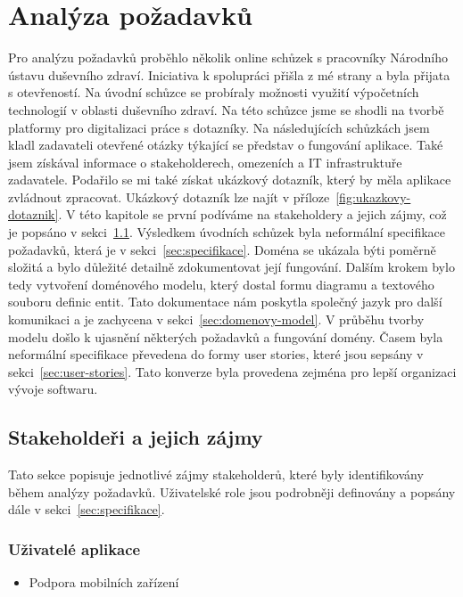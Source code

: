 \chapter{Analýza požadavků}\label{ch:analyza-pozadavku}

Pro analýzu požadavků proběhlo několik online schůzek s pracovníky Národního ústavu duševního zdraví.
Iniciativa k spolupráci přišla z mé strany a byla přijata s otevřeností.
Na úvodní schůzce se probíraly možnosti využití výpočetních technologií v oblasti duševního zdraví.
Na této schůzce jsme se shodli na tvorbě platformy pro digitalizaci práce s dotazníky.
Na následujících schůzkách jsem kladl zadavateli otevřené otázky týkající se představ o fungování aplikace.
Také jsem získával informace o stakeholderech, omezeních a IT infrastruktuře zadavatele.
Podařilo se mi také získat ukázkový dotazník, který by měla aplikace zvládnout zpracovat.
Ukázkový dotazník lze najít v příloze~\ref{fig:ukazkovy-dotaznik}.
V této kapitole se první podíváme na stakeholdery a jejich zájmy, což je popsáno v sekci~\ref{sec:stakeholderi}.
Výsledkem úvodních schůzek byla neformální specifikace požadavků, která je v sekci~\ref{sec:specifikace}.
Doména se ukázala býti poměrně složitá a bylo důležité detailně zdokumentovat její fungování.
Dalším krokem bylo tedy vytvoření doménového modelu, který dostal formu diagramu a textového souboru definic entit.
Tato dokumentace nám poskytla společný jazyk pro další komunikaci a je zachycena v sekci~\ref{sec:domenovy-model}.
V průběhu tvorby modelu došlo k ujasnění některých požadavků a fungování domény.
Časem byla neformální specifikace převedena do formy user stories, které jsou sepsány v sekci~\ref{sec:user-stories}.
Tato konverze byla provedena zejména pro lepší organizaci vývoje softwaru.


\section{Stakeholdeři a jejich zájmy}\label{sec:stakeholderi}

Tato sekce popisuje jednotlivé zájmy stakeholderů, které byly identifikovány během analýzy požadavků.
Uživatelské role jsou podrobněji definovány a popsány dále v sekci~\ref{sec:specifikace}.

\subsection*{Uživatelé aplikace}\label{subsec:uzivatele-aplikace}

\begin{itemize}
    \item
    Podpora mobilních zařízení
\end{itemize}

